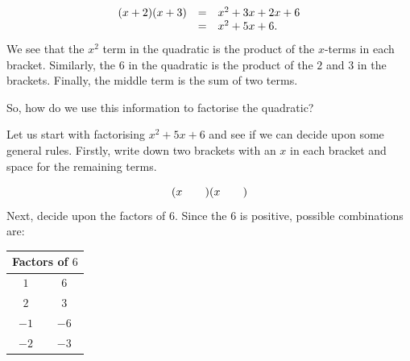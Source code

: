 \begin{equation*}
\begin{array}{ccl}\hfill (x+2)(x+3)& =& x^2+3x+2x+6 \\ & =& {x}^{2}+5x+6.\hfill \end{array}
\end{equation*}
We see that the ${x}^{2}$ term in the quadratic is the product of the $x$-terms in each bracket. Similarly, the $6$ in the quadratic is the product of the $2$ and $3$ in the brackets. Finally, the middle term is the sum of two terms.\par 
So, how do we use this information to factorise the quadratic?\par 
Let us start with factorising ${x}^{2}+5x+6$ and see if we can decide upon some general rules. Firstly, write down two brackets with an $x$ in each bracket and space for the remaining terms.\par 
\begin{equation*}
(x\phantom{\rule{2.em}{0ex}})(x\phantom{\rule{2.em}{0ex}})
\end{equation*}
Next, decide upon the factors of $6$. Since the $6$ is positive, possible combinations are:\par 
\begin{table}[H]
\begin{center}
\begin{tabular}[t]{|c|c|}\hline
\multicolumn{2}{|c|}{\textbf{Factors of $6$}}
\\ \hline
$1$ &
$6$%
\\ \hline
$2$ &
$3$%
\\ \hline
$-1$ &
$-6$%
\\ \hline
$-2$ &
$-3$%
\\ \hline
\end{tabular}
\end{center}
\end{table}

